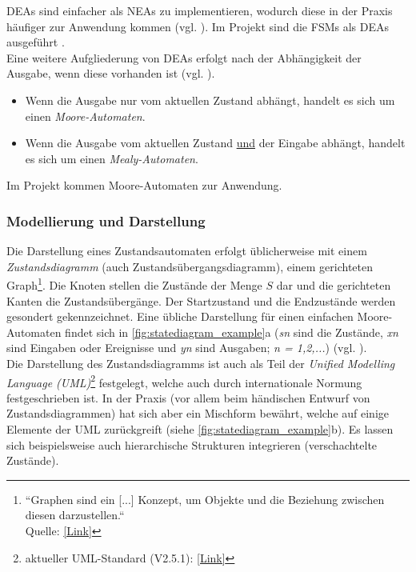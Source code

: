 \documentclass[a4paper, portrait, 12pt]{scrartcl} %
\begin{document}
DEAs sind einfacher als NEAs zu implementieren, wodurch diese in der Praxis häufiger zur Anwendung kommen (vgl. \cite[S. 14]{Baesig2019}). Im Projekt sind die FSMs als DEAs ausgeführt .\\

Eine weitere Aufgliederung von DEAs erfolgt nach der Abhängigkeit der Ausgabe, wenn diese vorhanden ist (vgl. \cite[S. 8f]{Baesig2019}).
\begin{itemize}
	\item Wenn die Ausgabe nur vom aktuellen Zustand abhängt, handelt es sich um einen \emph{Moore-Automaten}.
	\item Wenn die Ausgabe vom aktuellen Zustand \underline{und} der Eingabe abhängt, handelt es sich um einen \emph{Mealy-Automaten}.
\end{itemize}
Im Projekt kommen Moore-Automaten zur Anwendung.

\subsubsection{Modellierung und Darstellung}

Die Darstellung eines Zustandsautomaten erfolgt üblicherweise mit einem \emph{Zustandsdiagramm} (auch Zustandsübergangsdiagramm), einem gerichteten Graph\footnote{ ``Graphen sind ein [...] Konzept, um Objekte und die Beziehung zwischen diesen darzustellen.``\\Quelle: \href{https://www.tu-chemnitz.de/informatik/theoretische-informatik/TI-1/lecture-notes/06-00-graphs.html}{[Link]}}. Die Knoten stellen die Zustände der Menge $S$ dar und die gerichteten Kanten die Zustandsübergänge. Der Startzustand und die Endzustände werden gesondert gekennzeichnet. Eine übliche Darstellung für einen einfachen Moore-Automaten findet sich in \autoref{fig:statediagram_example}a (\emph{sn} sind die Zustände, \emph{xn} sind Eingaben oder Ereignisse und \emph{yn} sind Ausgaben; \emph{n = 1,2,...}) (vgl. \cite[S. 9]{Baesig2019}).\\

Die Darstellung des Zustandsdiagramms ist auch als Teil der \emph{Unified Modelling Language (UML)}\footnote{aktueller UML-Standard (V2.5.1): \href{https://www.omg.org/spec/UML/2.5.1/About-UML}{[Link]}} festgelegt, welche auch durch internationale Normung festgeschrieben ist. In der Praxis (vor allem beim händischen Entwurf von Zustandsdiagrammen) hat sich aber ein Mischform bewährt, welche auf einige Elemente der UML zurückgreift (siehe \autoref{fig:statediagram_example}b). Es lassen sich beispielsweise auch hierarchische Strukturen integrieren (verschachtelte Zustände).
\end{document}

